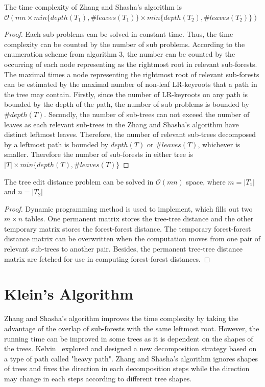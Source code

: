 \begin{lemma}
The time complexity of Zhang and Shasha's algorithm is $\mathcal{O}(mn \times min\{depth(T_1), \#leaves(T_1)\} \times min\{depth(T_2), \#leaves(T_2)\})$
\end{lemma}
\begin{proof}
Each sub problems can be solved in constant time. Thus, the time complexity can be counted by the number of sub problems. According to the enumeration scheme from algorithm 3, the number can be counted by the occurring of each node representing as the rightmost root in relevant sub-forests. The maximal times a node representing the rightmost root of relevant sub-forests can be estimated by the maximal number of non-leaf LR-keyroots that a path in the tree may contain. Firstly, since the number of LR-keyroots on any path is bounded by the depth of the path, the number of sub problems is bounded by $\#depth(T)$. Secondly, the number of sub-trees can not exceed the number of leaves as each relevant sub-trees in the Zhang and Shasha's algorithm have distinct leftmost leaves. Therefore, the number of relevant sub-trees decomposed by a leftmost path is bounded by $depth(T)$ or $\#leaves(T)$, whichever is smaller. Therefore the number of sub-forests in either tree is $\left\vert T \right\vert \times min\{depth(T), \#leaves(T)\}$  
\end{proof}
\begin{lemma}
The tree edit distance problem can be solved in $\mathcal{O}(mn)$ space, where $m=\left\vert T_1 \right\vert$ and $n=\left\vert T_2 \right\vert$
\end{lemma}
\begin{proof}
Dynamic programming method is used to implement, which fills out two $m \times n$ tables. One permanent matrix stores the tree-tree distance and the other temporary matrix stores the forest-forest distance. The temporary forest-forest distance matrix can be overwritten when the computation moves from one pair of relevant sub-trees to another pair. Besides, the permanent tree-tree distance matrix are fetched for use in computing forest-forest distances.
\end{proof}
\section{Klein's Algorithm}
Zhang and Shasha's algorithm improves the time complexity by taking the advantage of the overlap of  sub-forests with the same leftmost root. However, the running time can be improved in some trees as it is dependent on the shapes of the trees. Kelvin~\cite{klein1998computing} explored and designed a new decomposition strategy based on a type of path called "heavy path". Zhang and Shasha's algorithm ignores shapes of trees and fixes the direction in each decomposition steps while the direction may change in each steps according to different tree shapes. 

